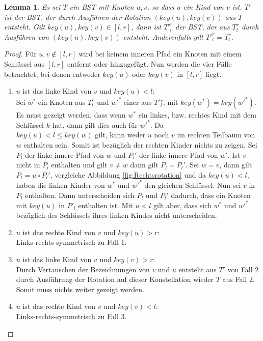 \documentclass[a4paper,12pt]{article}
\newtheorem{Lemma}{Lemma}[section]
\begin{document}
\begin{Lemma}  \label{lemmaWilber1} Es sei $T$ ein BST mit Knoten $u, v$, so dass $u$ ein Kind von $v$ ist. $T'$ ist der BST, der durch Ausführen der Rotation $\left(\mathit{key}\left(u\right),\mathit{key}\left(v\right)\right)$ aus $T$ entsteht. Gilt $\mathit{key}\left(u\right),\mathit{key}\left(v\right) \in \left[l,r\right]$, dann ist ${T'}^r_l$ der BST, der aus $T^r_l$ durch Ausführen von  $\left(\mathit{key}\left(u\right),\mathit{key}\left(v\right)\right)$ entsteht. Anderenfalls gilt ${T'}^r_l = T^r_l$.
\end{Lemma}
\begin{proof}
	\noindent Für $u,v \notin \left[l,r\right]$ wird bei keinem inneren Pfad ein Knoten mit einem Schlüssel aus $\left[l,r\right]$ entfernt oder hinzugefügt.
	Nun werden die vier Fälle betrachtet, bei denen entweder $\mathit{key}\left(u\right)$ oder $\mathit{key}\left(v\right)$ in $\left[l,r\right]$ liegt.
	\begin{enumerate}
		\item $u$ ist das linke Kind von $v$ und $\mathit{key}\left(u\right) < l$:\\
		Sei $w^*$ ein Knoten aus $T^r_l$ und $w'^*$ einer aus $T'{^r_l}$, mit $\mathit{key}(w^*) = \mathit{key}(w'^*)$. Es muss gezeigt werden, dass wenn $w^*$ ein linkes, bzw. rechtes Kind mit dem Schlüssel $k$ hat, dann gilt dies auch für $w'^*$. Da \\$\mathit{key}(u) < l \leq \mathit{key}(w) $ gilt, kann weder $u$ noch $v$ im rechten Teilbaum von $w$ enthalten sein. Somit ist bezüglich der rechten Kinder nichts zu zeigen. 
		Sei $P_l$ der linke innere Pfad von $w$ und $ {P_l}'$ der linke innere Pfad von $w'$. Ist $v$ nicht in $P_l$ enthalten und gilt $v \neq w$ dann gilt $P_l = P{_l}'$. Sei $w = v$, dann gilt $P_l = u  \circ  {P_l}'$, vergleiche Abbildung \ref{fig:Rechtsrotation} und da $\mathit{key}(u) < l$, haben die linken Kinder von $w^*$ und $w'^*$ den gleichen Schlüssel. Nun sei $v$ in $P_l$ enthalten. Dann unterscheiden sich  $P_l$ und  ${P_l}'$ dadurch, dass ein Knoten mit $\mathit{key}(u)$ in $P'_l$ enthalten ist. Mit $u < l$ gilt aber, dass sich $w^*$ und $w'^*$ bezüglich des Schlüssels ihres linken Kindes nicht unterscheiden.
	   	\item $u$ ist das rechte Kind von $v$ und $\mathit{key}\left(u\right) > r$:\\
	    Links-rechts-symmetrisch zu Fall 1. 	
		\item $u$ ist das linke Kind von $v$ und $\mathit{key}\left(v\right) > r$:\\
		Durch Vertauschen der Bezeichnungen von $v$ und $u$ entsteht aus $T'$ von Fall 2 durch Ausführung der Rotation auf dieser Konstellation wieder $T$ aus Fall 2. Somit muss nichts weiter gezeigt werden. 
		\item $u$ ist das rechte Kind von $v$ und $\mathit{key}\left(v\right) < l$:\\
		Links-rechts-symmetrisch zu Fall 3. \\
		

\end{enumerate}
\end{proof}
\end{document}
